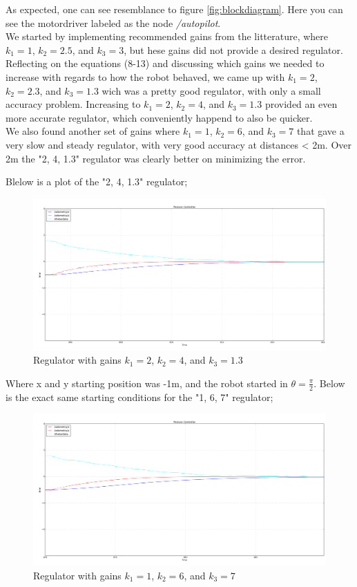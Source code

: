 \documentclass[a4paper,10pt]{article}
\begin{document}
		As expected, one can see resemblance to figure \ref{fig:blockdiagram}. Here you can see the motordriver labeled as the node \textit{/autopilot}. \\


		We started by implementing recommended gains from the litterature, where $k_{1}=1$, $k_{2}=2.5$, and $k_{3}=3$, but hese gains did not provide a desired regulator.
		Reflecting on the equations (8-13) and discussing which gains we needed to increase with regards to how the robot behaved, we came up with  $k_{1}=2$, $k_{2}=2.3$, and $k_{3}=1.3$
		wich was a pretty good regulator, with only a small accuracy problem. Increasing to $k_{1}=2$, $k_{2}=4$, and $k_{3}=1.3$ provided an even more accurate regulator, which
		conveniently happend to also be quicker.\\
		We also found another set of gains where $k_{1}=1$, $k_{2}=6$, and $k_{3}=7$ that gave a very slow and steady regulator, with very good accuracy at distances < 2m. Over 2m the
		"2, 4, 1.3" regulator was clearly better on minimizing the error.
		
		Blelow is a plot of the "2, 4, 1.3" regulator;
		\begin{figure}[H]
		\raggedleft
		\includegraphics[width=1.1\textwidth]{rover2_rqt_plot94_2413.png}
		\caption{Regulator with gains $k_{1}=2$, $k_{2}=4$, and $k_{3}=1.3$}	
 		\label{fig:plot2413}
		\end{figure}				 
	
		Where x and y starting position was -1m, and the robot started in $\theta=\frac{\pi}{2}$. Below is the exact same starting conditions for the "1, 6, 7" regulator;

		\begin{figure}[H]
		\centering
		\includegraphics[width=1.1\textwidth]{rover2_rqt_plot94_167.png}
		\caption{Regulator with gains $k_{1}=1$, $k_{2}=6$, and $k_{3}=7$}
 		\label{fig:plot167}
		\end{figure}
\end{document}
